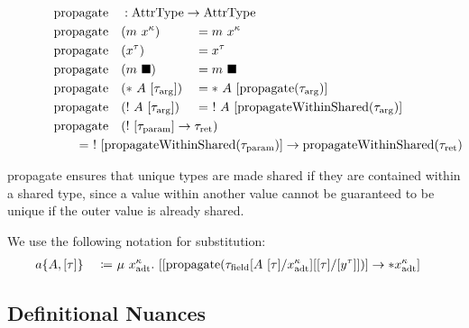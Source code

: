 \newcommand{\propagate}{\mathrm{propagate}}

\begin{alignat*}{3}
  &\propagate &&: \mathrlap{\AttrType \to \AttrType} \\
  &\propagate&&(m\ x^\kappa) &&= m\ x^\kappa \\
  &\propagate&&(x^\tau) &&= x^\tau \\
  &\propagate&&(m\ \blacksquare) &&= m\ \blacksquare \\
  &\propagate&&(*\ A\ [\tau_\arrg]) &&= *\ A\ [\propagate(\tau_\arrg)] \\
  &\propagate&&(!\ A\ [\tau_\arrg]) &&= \ !\ A\ [\propagateWithinShared(\tau_\arrg)] \\
  &\propagate&&\mathrlap{(!\ [\tau_\param] \to \tau_\ret)} \\
  &\rebreak{= \ !\ [\propagateWithinShared(\tau_\param)] \to \propagateWithinShared(\tau_\ret)}
\end{alignat*}

propagate ensures that unique types are made shared if they are contained within a shared type, since a value within another value cannot be guaranteed to be unique if the outer value is already shared. 

We use the following notation for substitution:
\begin{alignat*}{3}
	a\{A, [\tau]\}\ &&\coloneqq&\ \mu\ x^\kappa_\adt.\ [[\propagate(\tau_\field[A\ [\tau]/x^\kappa_\adt][[\tau]/[y^\tau]])] \to *x^\kappa_\adt]
\end{alignat*}

\subsection{Definitional Nuances}

